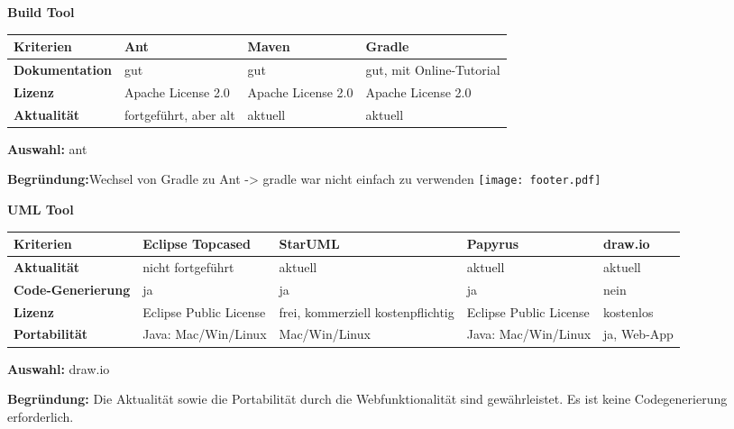 \documentclass[12pt]{article}
\begin{document}
\vspace*{10mm}

\textbf{Build Tool}

\begin{tabularx}{\textwidth}{|X|X|X|X|}\hline
 \textbf{Kriterien}&\textbf{Ant}&\textbf{Maven}&\textbf{Gradle}\\ \hline
 \textbf{Dokumentation}&gut&gut&gut, mit Online-Tutorial\\ \hline
 \textbf{Lizenz}&Apache License 2.0&Apache License 2.0&Apache License 2.0\\ \hline
 \textbf{Aktualität}&fortgeführt, aber alt&aktuell&aktuell\\ \hline
\end{tabularx}

\vspace*{3mm}

\textbf{Auswahl:} ant

\textbf{Begründung:}Wechsel von Gradle zu Ant -> gradle war nicht einfach zu verwenden
\vspace*{30mm}
\vspace*{\fill}
\texttt{[image: footer.pdf]}
\thispagestyle{empty}


\textbf{UML Tool}

\begin{tabularx}{\textwidth}{|X|X|X|X|X|}\hline
 \textbf{Kriterien}&\textbf{Eclipse Topcased}&\textbf{StarUML}&\textbf{Papyrus}&\textbf{draw.io}\\ \hline
 \textbf{Aktualität}&nicht fortgeführt&aktuell&aktuell&aktuell\\ \hline
 \textbf{Code-Generierung}&ja&ja&ja&nein\\ \hline
 \textbf{Lizenz}&Eclipse Public License&frei, kommerziell kostenpflichtig&Eclipse Public License&kostenlos\\ \hline
 \textbf{Portabilität}&Java: Mac/Win/Linux&Mac/Win/Linux&Java: Mac/Win/Linux&ja, Web-App\\ \hline
\end{tabularx}

\vspace*{3mm}

\textbf{Auswahl:} draw.io

\textbf{Begründung:} Die Aktualität sowie die Portabilität durch die Webfunktionalität sind gewährleistet. Es ist keine Codegenerierung erforderlich.

\vspace*{10mm}
\end{document}
